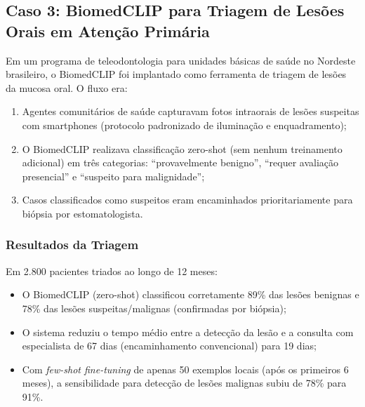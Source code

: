 \subsection{Caso 3: BiomedCLIP para Triagem de Lesões Orais em Atenção Primária}

Em um programa de teleodontologia para unidades básicas de saúde no Nordeste brasileiro, o BiomedCLIP foi implantado como ferramenta de triagem de lesões da mucosa oral. O fluxo era:
\begin{enumerate}
    \item Agentes comunitários de saúde capturavam fotos intraorais de lesões suspeitas com smartphones (protocolo padronizado de iluminação e enquadramento);
    \item O BiomedCLIP realizava classificação zero-shot (sem nenhum treinamento adicional) em três categorias: ``provavelmente benigno'', ``requer avaliação presencial'' e ``suspeito para malignidade'';
    \item Casos classificados como suspeitos eram encaminhados prioritariamente para biópsia por estomatologista.
\end{enumerate}

\subsubsection{Resultados da Triagem}

Em 2.800 pacientes triados ao longo de 12 meses:
\begin{itemize}
    \item O BiomedCLIP (zero-shot) classificou corretamente 89\% das lesões benignas e 78\% das lesões suspeitas/malignas (confirmadas por biópsia);
    \item O sistema reduziu o tempo médio entre a detecção da lesão e a consulta com especialista de 67 dias (encaminhamento convencional) para 19 dias;
    \item Com \textit{few-shot fine-tuning} de apenas 50 exemplos locais (após os primeiros 6 meses), a sensibilidade para detecção de lesões malignas subiu de 78\% para 91\%.
\end{itemize}


